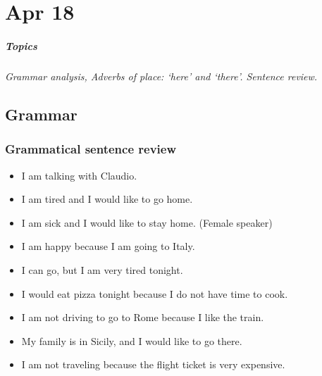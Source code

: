 \chapter{Apr 18}
\paragraph{Topics} 
\textit{Grammar analysis, Adverbs of place: `here' and `there'. Sentence review.}

\section{Grammar} \label{0418-Grammar}
\subsection{Grammatical sentence review}
\begin{itemize}
  \item I am talking with Claudio.  \\
  \item I am tired and I would like to go home.  \\
  \item I am sick and I would like to stay home. (Female speaker)  \\
  \item I am happy because I am going to Italy.  \\
  \item I can go, but I am very tired tonight.  \\
  \item I would eat pizza tonight because I do not have time to cook.  \\
  \item I am not driving to go to Rome because I like the train.  \\
  \item My family is in Sicily, and I would like to go there.  \\
  \item I am not traveling because the flight ticket is very expensive.  \\
 \end{itemize}
 
